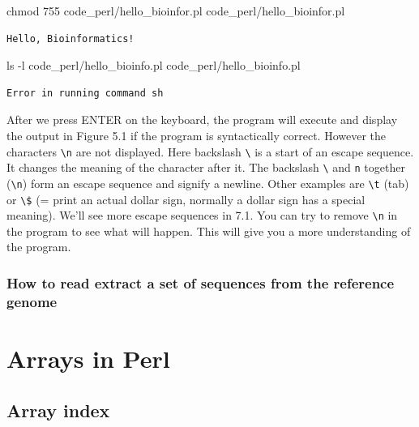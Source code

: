 \documentclass[]{book}
\makeatletter
\newenvironment{Shaded}{\begin{snugshade}}{\end{snugshade}}
\newcommand{\FunctionTok}[1]{\textcolor[rgb]{0.00,0.00,0.00}{#1}}
\newcommand{\ExtensionTok}[1]{#1}
\newcommand{\NormalTok}[1]{#1}
\newenvironment{kframe}{%
\medskip{}
\setlength{\fboxsep}{.8em}
 \def\at@end@of@kframe{}%
 \ifinner\ifhmode%
  \def\at@end@of@kframe{\end{minipage}}%
  \begin{minipage}{\columnwidth}%
 \fi\fi%
 \def\FrameCommand##1{\hskip\@totalleftmargin \hskip-\fboxsep
 \colorbox{shadecolor}{##1}\hskip-\fboxsep
     \hskip-\linewidth \hskip-\@totalleftmargin \hskip\columnwidth}%
 \MakeFramed {\advance\hsize-\width
   \@totalleftmargin\z@ \linewidth\hsize
   \@setminipage}}%
 {\par\unskip\endMakeFramed%
 \at@end@of@kframe}
\renewenvironment{Shaded}{\begin{kframe}}{\end{kframe}}
\theoremstyle{definition}
\theoremstyle{definition}
\theoremstyle{definition}
\theoremstyle{remark}
\makeatother
\begin{document}
\begin{Shaded}
\begin{Highlighting}[]
\FunctionTok{chmod}\NormalTok{ 755 code_perl/hello_bioinfor.pl}
\ExtensionTok{code_perl/hello_bioinfor.pl}
\end{Highlighting}
\end{Shaded}

\begin{verbatim}
Hello, Bioinformatics!
\end{verbatim}

\begin{Shaded}
\begin{Highlighting}[]
\FunctionTok{ls}\NormalTok{ -l code_perl/hello_bioinfo.pl}
\ExtensionTok{code_perl/hello_bioinfo.pl}
\end{Highlighting}
\end{Shaded}

\begin{verbatim}
Error in running command sh
\end{verbatim}

After we press ENTER on the keyboard, the program will execute and
display the output in Figure 5.1 if the program is syntactically
correct. However the characters \texttt{\textbackslash{}n} are not
displayed. Here backslash \texttt{\textbackslash{}} is a start of an
escape sequence. It changes the meaning of the character after it. The
backslash \texttt{\textbackslash{}} and \texttt{n} together
(\texttt{\textbackslash{}n}) form an escape sequence and signify a
newline. Other examples are \texttt{\textbackslash{}t} (tab) or
\texttt{\textbackslash{}\$} (= print an actual dollar sign, normally a
dollar sign has a special meaning). We'll see more escape sequences in
7.1. You can try to remove \texttt{\textbackslash{}n} in the program to
see what will happen. This will give you a more understanding of the
program.

\subsection{How to read extract a set of sequences from the reference
genome}\label{how-to-read-extract-a-set-of-sequences-from-the-reference-genome}

\chapter{Arrays in Perl}\label{arrays-in-perl}

\section{Array index}\label{array-index}
\end{document}
